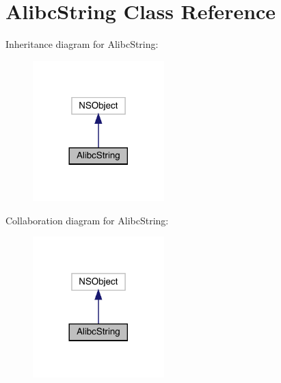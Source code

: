 \hypertarget{interface_alibc_string}{}\section{Alibc\+String Class Reference}
\label{interface_alibc_string}


Inheritance diagram for Alibc\+String\+:\nopagebreak
\begin{figure}[H]
\begin{center}
\leavevmode
\includegraphics[width=144pt]{interface_alibc_string__inherit__graph}
\end{center}
\end{figure}


Collaboration diagram for Alibc\+String\+:\nopagebreak
\begin{figure}[H]
\begin{center}
\leavevmode
\includegraphics[width=144pt]{interface_alibc_string__coll__graph}
\end{center}
\end{figure}
